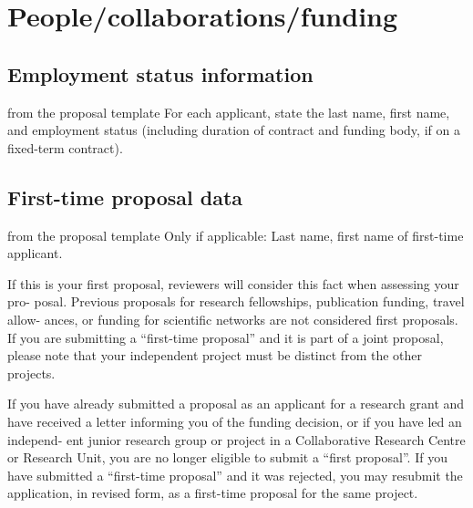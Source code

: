 \section{People/collaborations/funding}\label{sec:funds}

\subsection{Employment status information }
\begin{todo}{from the proposal template}
For each applicant, state the last name, first name, and employment status (including
duration of contract and funding body, if on a fixed-term contract).
\end{todo}

\subsection{First-time proposal data }
\begin{todo}{from the proposal template}
Only if applicable: Last name, first name of first-time applicant.

If this is your first proposal, reviewers will consider this fact when assessing your pro-
posal. Previous proposals for research fellowships, publication funding, travel allow-
ances, or funding for scientific networks are not considered first proposals. If you are
submitting a “first-time proposal” and it is part of a joint proposal, please note that your
independent project must be distinct from the other projects.

If you have already submitted a proposal as an applicant for a research grant and have
received a letter informing you of the funding decision, or if you have led an independ-
ent junior research group or project in a Collaborative Research Centre or Research
Unit, you are no longer eligible to submit a “first proposal”. If you have submitted a
“first-time proposal” and it was rejected, you may resubmit the application, in revised
form, as a first-time proposal for the same project.
\end{todo}

